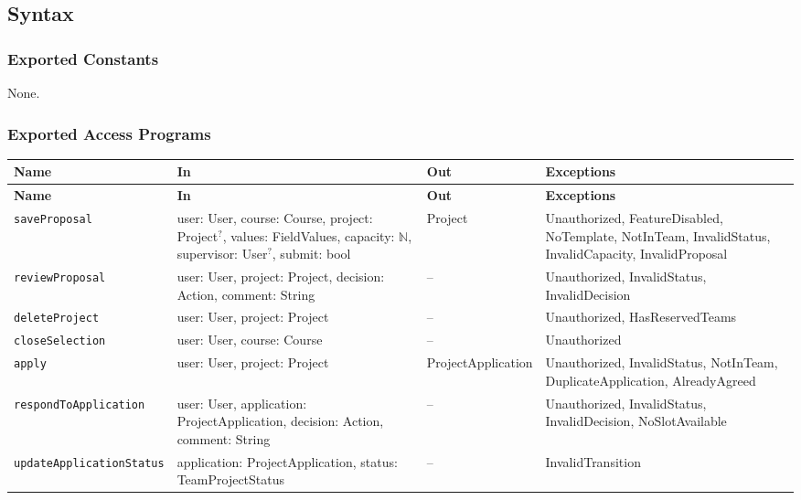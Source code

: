 \documentclass[12pt, titlepage]{article}
\begin{document}
\subsection{Syntax}

\subsubsection{Exported Constants}
None.

\subsubsection{Exported Access Programs}

\begingroup
\small
\setlength{\tabcolsep}{4pt}
\renewcommand{\arraystretch}{1.2}
\begin{longtable}{>{\raggedright\arraybackslash}p{}
                  >{\raggedright\arraybackslash}p{}
                  >{\raggedright\arraybackslash}p{}
                  >{\raggedright\arraybackslash}p{}}
\toprule
\textbf{Name} & \textbf{In} & \textbf{Out} & \textbf{Exceptions} \\
\midrule
\endfirsthead
\toprule
\textbf{Name} & \textbf{In} & \textbf{Out} & \textbf{Exceptions} \\
\midrule
\endhead
\endfoot
\texttt{saveProposal} & user: User, course: Course, project: Project$^{?}$, values: FieldValues, capacity: $\mathbb{N}$, supervisor: User$^{?}$, submit: bool & Project & Unauthorized, FeatureDisabled, NoTemplate, NotInTeam, InvalidStatus, InvalidCapacity, InvalidProposal \\
\texttt{reviewProposal} & user: User, project: Project, decision: Action, comment: String & -- & Unauthorized, InvalidStatus, InvalidDecision \\
\texttt{deleteProject} & user: User, project: Project & -- & Unauthorized, HasReservedTeams \\
\texttt{closeSelection} & user: User, course: Course & -- & Unauthorized \\
\texttt{apply} & user: User, project: Project & ProjectApplication & Unauthorized, InvalidStatus, NotInTeam, DuplicateApplication, AlreadyAgreed \\
\texttt{respondToApplication} & user: User, application: ProjectApplication, decision: Action, comment: String & -- & Unauthorized, InvalidStatus, InvalidDecision, NoSlotAvailable \\
\texttt{updateApplicationStatus} & application: ProjectApplication, status: TeamProjectStatus & -- & InvalidTransition \\

\end{longtable}
\end{document}
